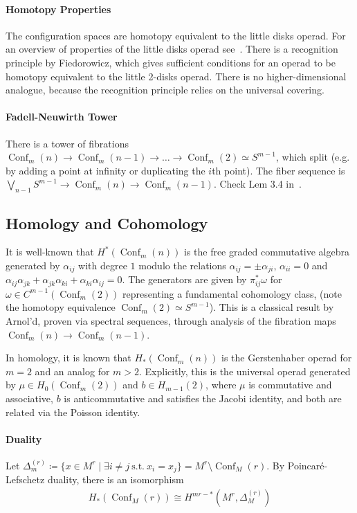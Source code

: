\documentclass{scrartcl}
\theoremstyle{plain}
\theoremstyle{definition}
\newcommand{\iso}{\cong}
\newcommand{\defeq}{\coloneqq}
\DeclareMathOperator{\Conf}{Conf}
\begin{document}
\paragraph{Homotopy Properties} The configuration spaces are homotopy equivalent to the little disks operad. For an overview of properties of the little disks operad see~\cite{fresse2017homotopy}. There is a recognition principle by Fiedorowicz, which gives sufficient conditions for an operad to be homotopy equivalent to the little 2-disks operad. There is no higher-dimensional analogue, because the recognition principle relies on the universal covering. 

\paragraph{Fadell-Neuwirth Tower} There is a tower of fibrations $\Conf_m(n) \to \Conf_m(n-1) \to \dots \to \Conf_m(2) \simeq S^{m-1}$, which split (e.g. by adding a point at infinity or duplicating the $i$th point). The fiber sequence is $\bigvee_{n-1} S^{m-1} \to \Conf_m(n) \to \Conf_m(n-1)$. Check Lem 3.4 in~\cite{sinha2010homology}. 

\subsection{Homology and Cohomology} 
It is well-known that $H^*(\Conf_m(n))$ is the free graded commutative algebra generated by $\alpha_{ij}$ with degree $1$ modulo the relations $\alpha_{ij} = \pm\alpha_{ji}$, $\alpha_{ii}=0$ and $\alpha_{ij}\alpha_{jk} + \alpha_{jk}\alpha_{ki} + \alpha_{ki}\alpha_{ij} = 0$. The generators are given by $\pi_{ij}^*\omega$ for $\omega\in C^{m-1}(\Conf_m(2))$ representing a fundamental cohomology class, (note the homotopy equivalence $\Conf_m(2)\simeq S^{m-1}$). This is a classical result by Arnol'd, proven via spectral sequences, through analysis of the fibration maps $\Conf_m(n) \to \Conf_m(n-1)$. 

In homology, it is known that $H_*(\Conf_m(n))$ is the Gerstenhaber operad for $m=2$ and an analog for $m>2$. Explicitly, this is the universal operad generated by $\mu\in H_0(\Conf_m(2))$ and $b\in H_{m-1}(2)$, where $\mu$ is commutative and associative, $b$ is anticommutative and satisfies the Jacobi identity, and both are related via the Poisson identity. 

\paragraph{Duality}
Let $\Delta_m^{(r)} \defeq \{x\in M^r \mid \exists i\neq j \ \text{s.t.}\ x_i = x_j\} = M^r\setminus \Conf_M(r)$. By Poincaré-Lefschetz duality, there is an isomorphism 
\begin{align*}
    H_*(\Conf_M(r)) \iso H^{mr- *}(M^r, \Delta^{(r)}_M)
\end{align*}
\end{document}

